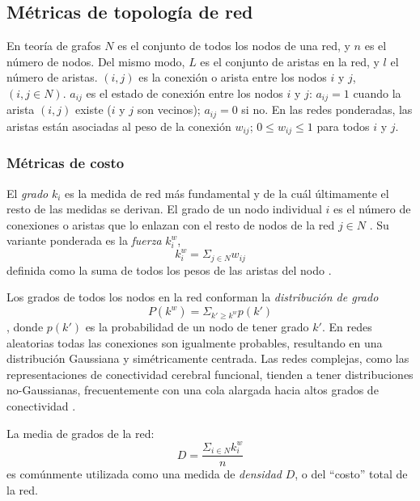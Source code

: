 \subsection{Métricas de topología de red}
En teoría de grafos $N$ es el conjunto de todos los nodos de una red, y $n$ es el número de nodos.
Del mismo modo, $L$ es el conjunto de aristas en la red, y $l$ el número de aristas.
$(i,j)$ es la conexión o arista entre los nodos $i$ y $j$, $(i,j \in N)$.
$a_{ij}$ es el estado de conexión entre los nodos $i$ y $j$: $a_{ij} = 1$ cuando la arista $(i,j)$ existe ($i$ y $j$ son vecinos); $a_{ij} = 0$ si no.
En las redes ponderadas, las aristas están asociadas al peso de la conexión $w_{ij}$; $0 \leq w_{ij} \leq 1$ para todos $i$ y $j$.

\subsubsection{Métricas de costo}
El \emph{grado} $k_i$ es la medida de red más fundamental y de la cuál últimamente el resto de las medidas se derivan.
El grado de un nodo individual $i$ es el número de conexiones o aristas que lo enlazan con el resto de nodos de la red $j \in N$ \parencite{Bullmore2009a,Rubinov2010}.
Su variante ponderada es la \emph{fuerza} $k_i^w$,
\begin{equation}\label{eqStrength}
    k_i^w = \Sigma_{j \in N}w_{ij}
\end{equation}
definida como la suma de todos los pesos de las aristas del nodo \parencite{Rubinov2010}.\par
Los grados de todos los nodos en la red conforman la \emph{distribución de grado} \parencite{Rubinov2010}
\begin{equation}\label{eqDDist}
    P(k^w)=\Sigma_{k' \geq k^w}p(k')
\end{equation}, donde $p(k')$ es la probabilidad de un nodo de tener grado $k'$.
En redes aleatorias todas las conexiones son igualmente probables, resultando en una distribución Gaussiana y simétricamente centrada.
Las redes complejas, como las representaciones de conectividad cerebral funcional, tienden a tener distribuciones no-Gaussianas, frecuentemente con una cola alargada hacia altos grados de conectividad \parencite{Bullmore2009a}. \par
La media de grados de la red:
\begin{equation}\label{eqDensity}
    D=\frac{\Sigma_{i \in N}k_i^w}{n}
\end{equation}
es comúnmente utilizada como una medida de \emph{densidad} $D$, o del ``costo'' total de la red.

